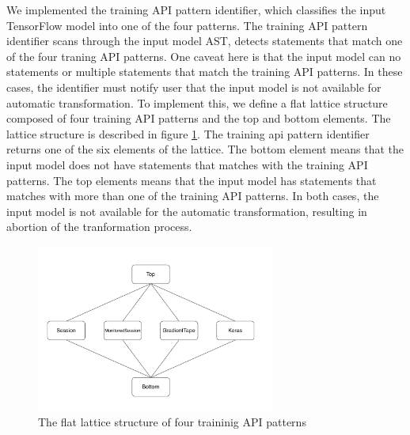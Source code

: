 We implemented the training API pattern identifier, which classifies the
input TensorFlow model into one of the four patterns.
The training API pattern identifier scans through the input model AST,
detects statements that match one of the four traning API patterns.
One caveat here is that the input model can no statements or multiple statements
that match the training API patterns.
In these cases, the identifier must notify user that the
input model is not available for automatic transformation.
To implement this, we define a flat lattice structure composed of four 
training API patterns and the top and bottom elements.
The lattice structure is described in figure \ref{fig:pattern:lattice}.
The training api pattern identifier returns one of the six elements of
the lattice. The bottom element means that the input model does not have
statements that matches with the training API patterns.
The top elements means that the input model has statements that matches with
more than one of the training API patterns.
In both cases, the input model is not available for the automatic 
transformation, resulting in abortion of the tranformation process.

\begin{figure}[ht!]
  \centering
  \includegraphics[width=0.7\textwidth]{lattice.pdf}
  \caption{The flat lattice structure of four traininig API patterns}
  \label{fig:pattern:lattice}
\end{figure}




%     
% 


